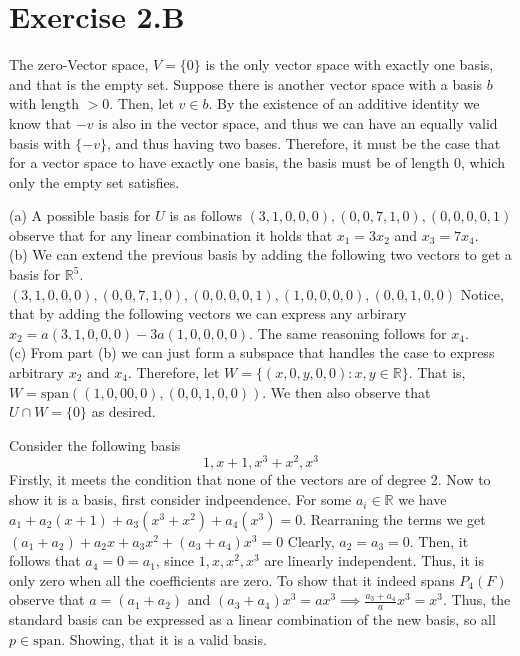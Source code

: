 \documentclass[10pt, twocolumn]{article}
\newcommand{\R}{\mathbb{R}}
\newcommand{\vspan}{\text{span}}
\begin{document}
\section{Exercise 2.B}
\begin{q}[Problem 1]
    The zero-Vector space, $ V = \{0\} $ is the only vector space with exactly one basis, and that is the empty set. 
    Suppose there is another vector space with a basis $ b $ with length $ > 0 $. 
    Then, let $ v \in b $. 
    By the existence of an additive identity we know that $ -v $ is also in the vector space, and thus we can have an equally valid basis with $ \{-v\} $, and thus having two bases.
    Therefore, it must be the case that for a vector space to have exactly one basis, the basis must be of length 0, which only the empty set satisfies. 
\end{q}
\begin{q}[Problem 3]
    (a) A possible basis for $ U $ is as follows
    $ (3,1, 0, 0, 0), (0, 0, 7, 1, 0), (0, 0, 0, 0, 1) $
    observe that for any linear combination it holds that $ x_1 = 3x_2 $ and $ x_3 = 7x_4 $. \\
    (b) We can extend the previous basis by adding the following two vectors to get a basis for $ \R ^5 $.
    $ (3,1, 0, 0, 0), (0, 0, 7, 1, 0), (0, 0, 0, 0, 1), (1, 0, 0, 0, 0), (0, 0, 1, 0, 0) $
    Notice, that by adding the following vectors we can express any arbirary $ x_2 = a(3, 1, 0, 0, 0) - 3a(1, 0, 0, 0, 0) $. 
    The same reasoning follows for $ x_4$. \\
    (c) From part (b) we can just form a subspace that handles the case to express arbitrary $ x_2 $ and $ x_4 $.
    Therefore, let $ W = \{(x, 0, y, 0, 0) \colon x, y \in \R \} $. That is, $ W = \vspan((1, 0, 0 0, 0), (0, 0, 1, 0, 0))$. 
    We then also observe that $ U \cap W = \{0\} $ as desired. 
\end{q}
\begin{q}[Problem 5]
    Consider the following basis 
    $$ 1, x + 1, x^3 + x^2, x^3 $$ 
    Firstly, it meets the condition that none of the vectors are of degree 2. 
    Now to show it is a basis, first consider indpeendence. For some $ a_i \in \R $ we have 
    $ a_1 + a_2(x + 1)  + a_3(x^3 + x^2) + a_4 (x^3) = 0 $. 
    Rearraning the terms we get 
    $ (a_1 + a_2) + a_2 x + a_3 x^2 + (a_3 + a_4) x^3  = 0 $ 
    Clearly, $ a_2 = a_3 = 0 $. Then, it follows that $ a_4 = 0 = a_1 $, since $ 1, x, x^2, x^3 $ are linearly independent. 
    Thus, it is only zero when all the coefficients are zero. 
    To show that it indeed spans $ P_4(F) $ observe that $ a = (a_1 + a_2) $ and $ (a_3 + a_4)x^3 = ax^3 \implies \frac{a_3 + a_4}{a}x^3 = x^3$. 
    Thus, the standard basis can be expressed as a linear combination of the new basis, so all $ p \in \vspan $.
    Showing, that it is a valid basis.
\end{q}
\end{document}
